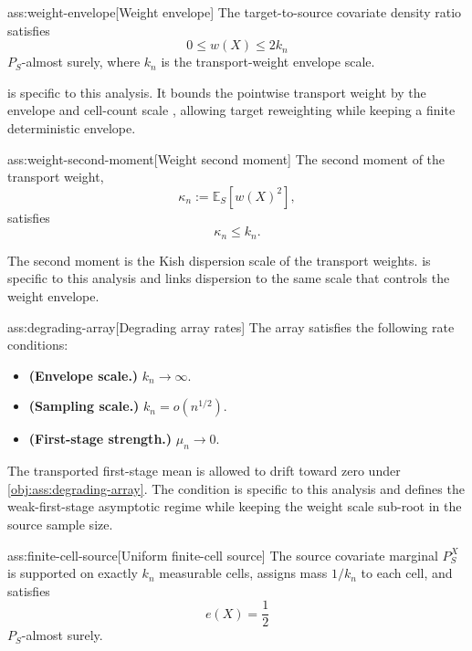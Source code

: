 \documentclass[11pt]{article}
\begin{document}
\begin{assumptionv}{ass:weight-envelope}[Weight envelope]
The target-to-source covariate density ratio satisfies
\[
0 \le w(X) \le 2k_n
\]
\(P_S\)-almost surely, where \(k_n\) is the transport-weight envelope scale.
\end{assumptionv}

 is specific to this analysis. It bounds the pointwise transport weight by the envelope and cell-count scale , allowing target reweighting while keeping a finite deterministic envelope.

\begin{assumptionv}{ass:weight-second-moment}[Weight second moment]
The second moment of the transport weight,
\[
\kappa_n:=\mathbb E_S\!\left[w(X)^2\right],
\]
satisfies
\[
\kappa_n \le k_n .
\]
\end{assumptionv}

The second moment  is the Kish dispersion scale of the transport weights.  is specific to this analysis and links dispersion to the same scale that controls the weight envelope.

\begin{assumptionv}{ass:degrading-array}[Degrading array rates]
The array satisfies the following rate conditions:
\begin{itemize}
\item \textbf{(Envelope scale.)} \(k_n \to \infty\).
\item \textbf{(Sampling scale.)} \(k_n=o(n^{1/2})\).
\item \textbf{(First-stage strength.)} \(\mu_n\to0\).
\end{itemize}
\end{assumptionv}

The transported first-stage mean  is allowed to drift toward zero under \cref{obj:ass:degrading-array}. The condition is specific to this analysis and defines the weak-first-stage asymptotic regime while keeping the weight scale sub-root in the source sample size.

\begin{assumptionv}{ass:finite-cell-source}[Uniform finite-cell source]
The source covariate marginal \(P_S^X\) is supported on exactly \(k_n\) measurable cells, assigns mass \(1/k_n\) to each cell, and satisfies
\[
e(X)=\frac12
\]
\(P_S\)-almost surely.
\end{assumptionv}
\end{document}
